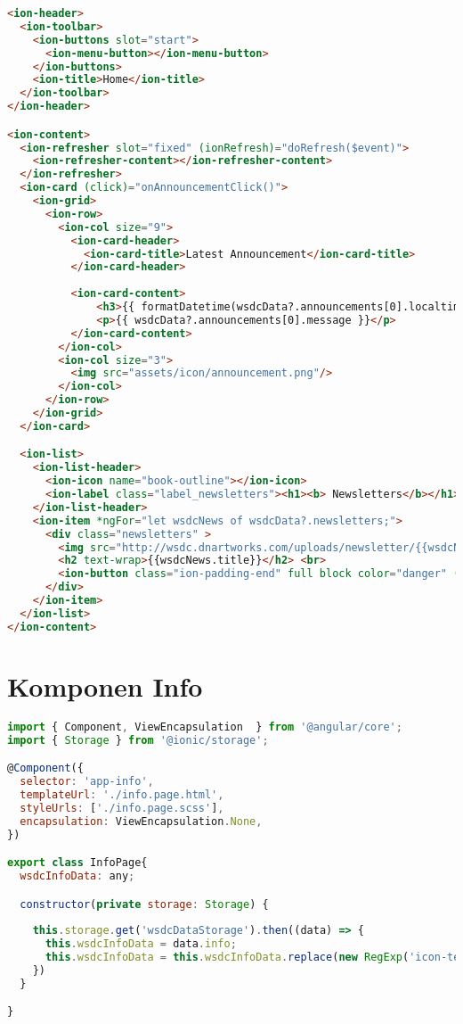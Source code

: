 \begin{lstlisting}[language=html, label={lst:home.page.html}, caption=home.page.html]
<ion-header>
  <ion-toolbar>
    <ion-buttons slot="start">
      <ion-menu-button></ion-menu-button>
    </ion-buttons>
    <ion-title>Home</ion-title>
  </ion-toolbar>
</ion-header>

<ion-content>
  <ion-refresher slot="fixed" (ionRefresh)="doRefresh($event)">
    <ion-refresher-content></ion-refresher-content>
  </ion-refresher>
  <ion-card (click)="onAnnouncementClick()">
    <ion-grid>
      <ion-row>
        <ion-col size="9">
          <ion-card-header>
            <ion-card-title>Latest Announcement</ion-card-title>
          </ion-card-header>
        
          <ion-card-content>
              <h3>{{ formatDatetime(wsdcData?.announcements[0].localtime) }}</h3>
              <p>{{ wsdcData?.announcements[0].message }}</p>
          </ion-card-content>
        </ion-col>
        <ion-col size="3">
          <img src="assets/icon/announcement.png"/>
        </ion-col>
      </ion-row>
    </ion-grid>
  </ion-card>

  <ion-list>
    <ion-list-header>
      <ion-icon name="book-outline"></ion-icon>
      <ion-label class="label_newsletters"><h1><b> Newsletters</b></h1></ion-label>
    </ion-list-header>
    <ion-item *ngFor="let wsdcNews of wsdcData?.newsletters;">
      <div class="newsletters" >
        <img src="http://wsdc.dnartworks.com/uploads/newsletter/{{wsdcNews.id}}/thumbnail.jpg">
        <h2 text-wrap>{{wsdcNews.title}}</h2> <br>
        <ion-button class="ion-padding-end" full block color="danger" (click)="launch(wsdcNews.url)">Read More</ion-button>
      </div>
    </ion-item>
  </ion-list>
</ion-content>
\end{lstlisting} 

\section{Komponen Info} 
\label{sec:lampiranKomponenInfo}

\begin{lstlisting}[language=JavaScript, label={lst:info.page.ts}, caption=info.page.ts]
import { Component, ViewEncapsulation  } from '@angular/core';
import { Storage } from '@ionic/storage';

@Component({
  selector: 'app-info',
  templateUrl: './info.page.html',
  styleUrls: ['./info.page.scss'],
  encapsulation: ViewEncapsulation.None,
})

export class InfoPage{
  wsdcInfoData: any;

  constructor(private storage: Storage) { 
    
    this.storage.get('wsdcDataStorage').then((data) => {
      this.wsdcInfoData = data.info;
      this.wsdcInfoData = this.wsdcInfoData.replace(new RegExp('icon-telephone','g'), '<img src="assets/icon/telephone.png" alt="Telephone Icon" class="icon"/>');
    })
  }

}

\end{lstlisting} 


